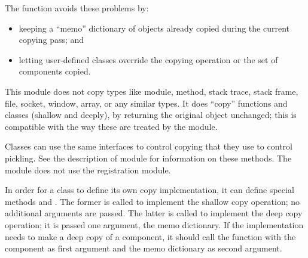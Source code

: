 The  function avoids these problems by:

\begin{itemize}

\item
keeping a ``memo'' dictionary of objects already copied during the current
copying pass; and

\item
letting user-defined classes override the copying operation or the
set of components copied.

\end{itemize}

This module does not copy types like module, method,
stack trace, stack frame, file, socket, window, array, or any similar
types.  It does ``copy'' functions and classes (shallow and deeply),
by returning the original object unchanged; this is compatible with
the way these are treated by the  module.

Classes can use the same interfaces to control copying that they use
to control pickling.  See the description of module
 for information on these
methods.  The  module does not use the
 registration module.

In order for a class to define its own copy implementation, it can
define special methods  and
.  The former is called to implement the
shallow copy operation; no additional arguments are passed.  The
latter is called to implement the deep copy operation; it is passed
one argument, the memo dictionary.  If the 
implementation needs to make a deep copy of a component, it should
call the  function with the component as first
argument and the memo dictionary as second argument.

\begin{seealso}
\end{seealso}
